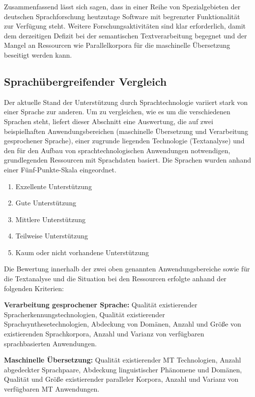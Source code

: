 \documentclass[]{../../metanetpaper}
\begin{document}
\begin{multicols}{2}
Zusammenfassend lässt sich sagen, dass in einer Reihe von Spezialgebieten der deutschen Sprachforschung heutzutage Software mit begrenzter Funktionalität zur Verfügung steht. Weitere Forschungsaktivitäten sind klar erforderlich, damit dem derzeitigen Defizit bei der semantischen Textverarbeitung begegnet und der Mangel an Ressourcen wie Parallelkorpora für die maschinelle Übersetzung beseitigt werden kann.

\subsection{Sprachübergreifender Vergleich}

Der aktuelle Stand der Unterstützung durch Sprachtechnologie variiert stark von einer Sprache zur anderen. Um zu vergleichen, wie es um die verschiedenen Sprachen steht, liefert dieser Abschnitt eine Auswertung, die auf zwei beispielhaften Anwendungsbereichen (maschinelle Übersetzung und Verarbeitung gesprochener Sprache), einer zugrunde liegenden Technologie (Textanalyse) und den für den Aufbau von sprachtechnologischen Anwendungen notwendigen, grundlegenden Ressourcen mit Sprachdaten basiert. Die Sprachen wurden anhand einer Fünf-Punkte-Skala eingeordnet.

\begin{enumerate}
\item Exzellente Unterstützung
\item Gute Unterstützung
\item Mittlere Unterstützung
\item Teilweise Unterstützung
\item Kaum oder nicht vorhandene Unterstützung
\end{enumerate}

Die Bewertung innerhalb der zwei oben genannten Anwendungsbereiche sowie für die Textanalyse und die Situation bei den Ressourcen erfolgte anhand der folgenden Kriterien:

\textbf{Verarbeitung gesprochener Sprache:} Qualität existierender Spracherkennungstechnologien, Qualität existierender Sprachsynthesetechnologien, Abdeckung von Domänen, Anzahl und Größe von existierenden Sprachkorpora, Anzahl und Varianz von verfügbaren sprachbasierten Anwendungen.

\textbf{Maschinelle Übersetzung:} Qualität existierender MT Technologien, Anzahl abgedeckter Sprachpaare, Abdeckung linguistischer Phänomene und Domänen, Qualität und Größe existierender paralleler Korpora, Anzahl und Varianz von verfügbaren MT Anwendungen.


\end{multicols}
\end{document}
